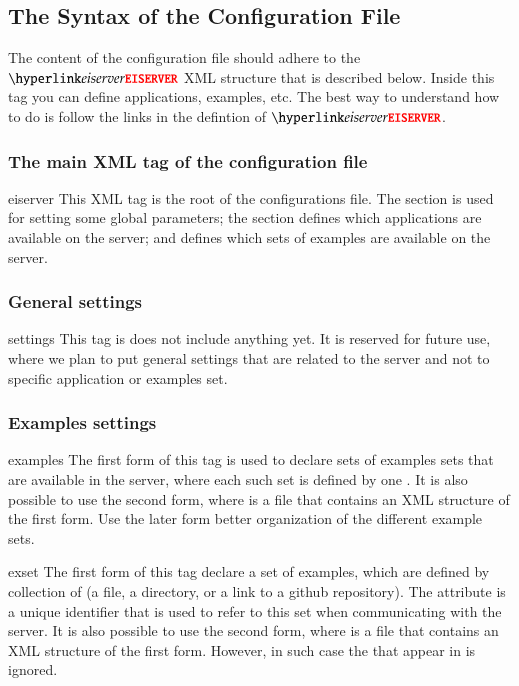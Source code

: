 \subsection{The Syntax of the Configuration File}

The content of the configuration file should adhere to the
$\xmlstructrefwb{eiserver}$ XML structure that is described
below. 
%
Inside this tag you can define applications, examples, etc. The best
way to understand how to do is follow the links in the defintion of
$\xmlstructrefwb{eiserver}$.

\subsubsection*{The main XML tag of the configuration file}

\bigskip
\xmlstruct
{eiserver}
{%
This XML tag is the root of the configurations file.
%
  The  section is used for setting some global
  parameters; the  section defines which
  applications are available on the server; and
   defines which sets of examples are available
  on the server.
%
}
{}%

\subsubsection*{General settings}

\bigskip
\xmlstruct
{settings}
{%
%
  This tag is does not include anything yet. It is reserved for future
  use, where we plan to put general settings that are related to the
  server and not to specific application or examples set.
%
}
{}%

\subsubsection*{Examples settings}

\bigskip
\xmlstruct
{examples}
{%
%
  The first form of this tag is used to declare sets of examples sets
  that are available in the server, where each such set is defined by
  one .
%
  It is also possible to use the second form, where
   is a file that contains an XML structure
  of the first form. Use the later form better organization of the
  different example sets.
%
}
{}%

\bigskip
\xmlstruct
{exset}
{%
%
  The first form of this tag declare a set of examples, which are
  defined by collection of  (a file, a
  directory, or a link to a github repository).
%
  The attribute  is a unique identifier that is used
  to refer to this set when communicating with the server.
%
  It is also possible to use the second form, where
   is a file that contains an XML structure
  of the first form. However, in such case the  that
  appear in  is ignored.
%
}
{}%

